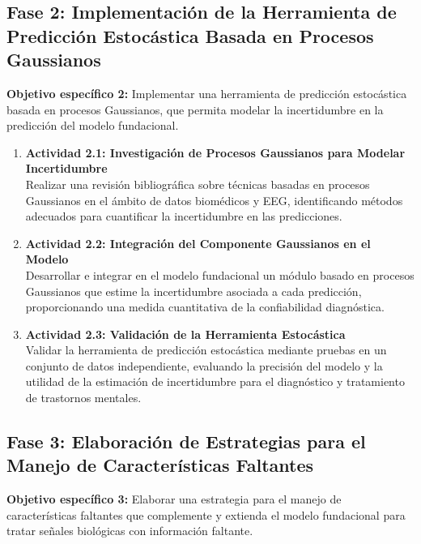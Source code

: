 \subsection*{Fase 2: Implementación de la Herramienta de Predicción Estocástica Basada en Procesos Gaussianos}
\textbf{Objetivo específico 2:} Implementar una herramienta de predicción estocástica basada en procesos Gaussianos, que permita modelar la incertidumbre en la predicción del modelo fundacional.

\begin{enumerate}
	\item \textbf{Actividad 2.1: Investigación de Procesos Gaussianos para Modelar Incertidumbre}\\
	Realizar una revisión bibliográfica sobre técnicas basadas en procesos Gaussianos en el ámbito de datos biomédicos y EEG, identificando métodos adecuados para cuantificar la incertidumbre en las predicciones.
	
	\item \textbf{Actividad 2.2: Integración del Componente Gaussianos en el Modelo}\\
	Desarrollar e integrar en el modelo fundacional un módulo basado en procesos Gaussianos que estime la incertidumbre asociada a cada predicción, proporcionando una medida cuantitativa de la confiabilidad diagnóstica.
	
	\item \textbf{Actividad 2.3: Validación de la Herramienta Estocástica}\\
	Validar la herramienta de predicción estocástica mediante pruebas en un conjunto de datos independiente, evaluando la precisión del modelo y la utilidad de la estimación de incertidumbre para el diagnóstico y tratamiento de trastornos mentales.
\end{enumerate}

\subsection*{Fase 3: Elaboración de Estrategias para el Manejo de Características Faltantes}
\textbf{Objetivo específico 3:} Elaborar una estrategia para el manejo de características faltantes que complemente y extienda el modelo fundacional para tratar señales biológicas con información faltante.

